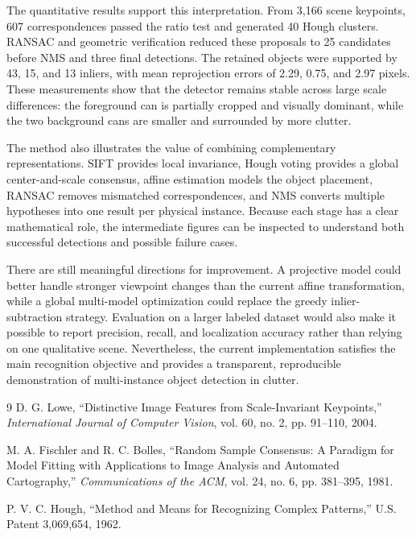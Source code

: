 \documentclass[10pt,twocolumn]{article}
\begin{document}
The quantitative results support this interpretation. From 3,166 scene keypoints, 607 correspondences passed the ratio test and generated 40 Hough clusters. RANSAC and geometric verification reduced these proposals to 25 candidates before NMS and three final detections. The retained objects were supported by 43, 15, and 13 inliers, with mean reprojection errors of 2.29, 0.75, and 2.97 pixels. These measurements show that the detector remains stable across large scale differences: the foreground can is partially cropped and visually dominant, while the two background cans are smaller and surrounded by more clutter.

The method also illustrates the value of combining complementary representations. SIFT provides local invariance, Hough voting provides a global center-and-scale consensus, affine estimation models the object placement, RANSAC removes mismatched correspondences, and NMS converts multiple hypotheses into one result per physical instance. Because each stage has a clear mathematical role, the intermediate figures can be inspected to understand both successful detections and possible failure cases.

There are still meaningful directions for improvement. A projective model could better handle stronger viewpoint changes than the current affine transformation, while a global multi-model optimization could replace the greedy inlier-subtraction strategy. Evaluation on a larger labeled dataset would also make it possible to report precision, recall, and localization accuracy rather than relying on one qualitative scene. Nevertheless, the current implementation satisfies the main recognition objective and provides a transparent, reproducible demonstration of multi-instance object detection in clutter.

\begin{thebibliography}{9}
D. G. Lowe, ``Distinctive Image Features from Scale-Invariant Keypoints,'' \emph{International Journal of Computer Vision}, vol. 60, no. 2, pp. 91--110, 2004.

M. A. Fischler and R. C. Bolles, ``Random Sample Consensus: A Paradigm for Model Fitting with Applications to Image Analysis and Automated Cartography,'' \emph{Communications of the ACM}, vol. 24, no. 6, pp. 381--395, 1981.

P. V. C. Hough, ``Method and Means for Recognizing Complex Patterns,'' U.S. Patent 3,069,654, 1962.
\end{thebibliography}
\end{document}
